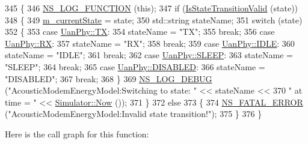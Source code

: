 \begin{DoxyCode}
345 \{
346   \hyperlink{log-macros-disabled_8h_a90b90d5bad1f39cb1b64923ea94c0761}{NS\_LOG\_FUNCTION} (\textcolor{keyword}{this});
347   \textcolor{keywordflow}{if} (\hyperlink{classns3_1_1AcousticModemEnergyModel_ae9feec10f18afb384f0ce85e6a7f2ea2}{IsStateTransitionValid} (state))
348     \{
349       \hyperlink{classns3_1_1AcousticModemEnergyModel_a7fa8d6ead4a746d2afac40f060921af0}{m\_currentState} = state;
350       std::string stateName;
351       \textcolor{keywordflow}{switch} (state)
352         \{
353         \textcolor{keywordflow}{case} \hyperlink{classns3_1_1UanPhy_afc5e3b6b00589131e4a56ececd42bf9faab8bf12eabef757b7e77f59f71ff102c}{UanPhy::TX}:
354           stateName = \textcolor{stringliteral}{"TX"};
355           \textcolor{keywordflow}{break};
356         \textcolor{keywordflow}{case} \hyperlink{classns3_1_1UanPhy_afc5e3b6b00589131e4a56ececd42bf9fa35e2631d9c2bed2205eaa7f4da74dda8}{UanPhy::RX}:
357           stateName = \textcolor{stringliteral}{"RX"};
358           \textcolor{keywordflow}{break};
359         \textcolor{keywordflow}{case} \hyperlink{classns3_1_1UanPhy_afc5e3b6b00589131e4a56ececd42bf9fa6143a554e834f71f498e5f781682d347}{UanPhy::IDLE}:
360           stateName = \textcolor{stringliteral}{"IDLE"};
361           \textcolor{keywordflow}{break};
362         \textcolor{keywordflow}{case} \hyperlink{classns3_1_1UanPhy_afc5e3b6b00589131e4a56ececd42bf9fa4992fce9c378d8a56ef87ca363d9a417}{UanPhy::SLEEP}:
363           stateName = \textcolor{stringliteral}{"SLEEP"};
364           \textcolor{keywordflow}{break};
365         \textcolor{keywordflow}{case} \hyperlink{classns3_1_1UanPhy_afc5e3b6b00589131e4a56ececd42bf9faa9eccd74ad50233a8402ed255e273361}{UanPhy::DISABLED}:
366           stateName = \textcolor{stringliteral}{"DISABLED"};
367           \textcolor{keywordflow}{break};
368         \}
369       \hyperlink{group__logging_ga413f1886406d49f59a6a0a89b77b4d0a}{NS\_LOG\_DEBUG} (\textcolor{stringliteral}{"AcousticModemEnergyModel:Switching to state: "} << stateName <<
370                     \textcolor{stringliteral}{" at time = "} << \hyperlink{classns3_1_1Simulator_ac3178fa975b419f7875e7105be122800}{Simulator::Now} ());
371     \}
372   \textcolor{keywordflow}{else}
373     \{
374       \hyperlink{group__fatal_ga5131d5e3f75d7d4cbfd706ac456fdc85}{NS\_FATAL\_ERROR} (\textcolor{stringliteral}{"AcousticModemEnergyModel:Invalid state transition!"});
375     \}
376 \}
\end{DoxyCode}


Here is the call graph for this function\+:




